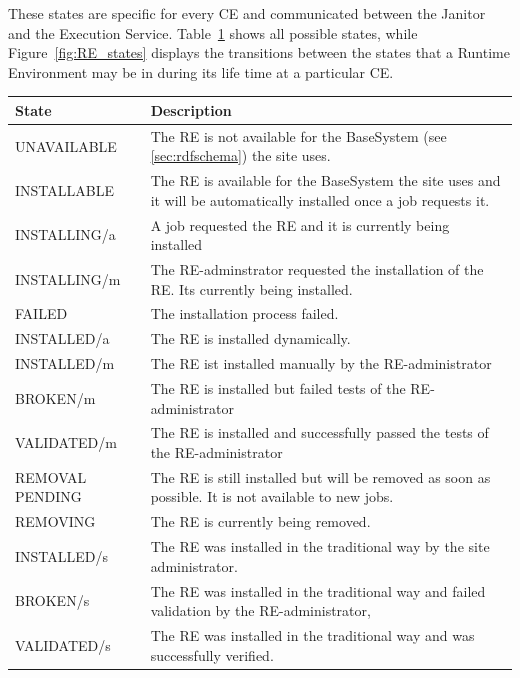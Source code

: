 These states are specific for every CE and communicated
between the Janitor and the Execution Service. Table~\ref{tab:states} shows all
possible states, while Figure~\ref{fig:RE_states}
displays the transitions between the states that a Runtime Environment may
be in during its life time at a particular CE.   



\begin{table}[!h]
 \begin{center}
 \begin{tabular}{lp{12cm}}
 State&Description\\
 \hline
 UNAVAILABLE&
	The RE is not available for the BaseSystem (see \ref{sec:rdfschema}) the site uses. \\
 INSTALLABLE&
	The RE is available for the BaseSystem the site uses and it
	will be automatically installed once a job requests it. \\
 INSTALLING/a&
	A job requested the RE and it is currently being installed \\
 INSTALLING/m&
	The RE-adminstrator requested the installation of the RE. Its
	currently being installed. \\
 FAILED&
	The installation process failed. \\
 INSTALLED/a&
	The RE is installed dynamically. \\
 INSTALLED/m&
	The RE ist installed manually by the RE-administrator \\
 BROKEN/m&
	The RE is installed but failed tests of the RE-administrator \\
 VALIDATED/m&
	The RE is installed and successfully passed the tests of the
	RE-administrator \\
 REMOVAL PENDING&
	The RE is still installed but will be removed as soon as
	possible. It is not available to new jobs. \\
 REMOVING&
	The RE is currently being removed. \\
 INSTALLED/s&
	The RE was installed in the traditional way by the site administrator. \\
 BROKEN/s&
	The RE was installed in the traditional way and failed
	validation by the RE-administrator, \\
 VALIDATED/s&
	The RE was installed in the traditional way and was
	successfully verified.
 \\
 \end{tabular}
 \end{center}
 \label{tab:states}
 \end{table}

